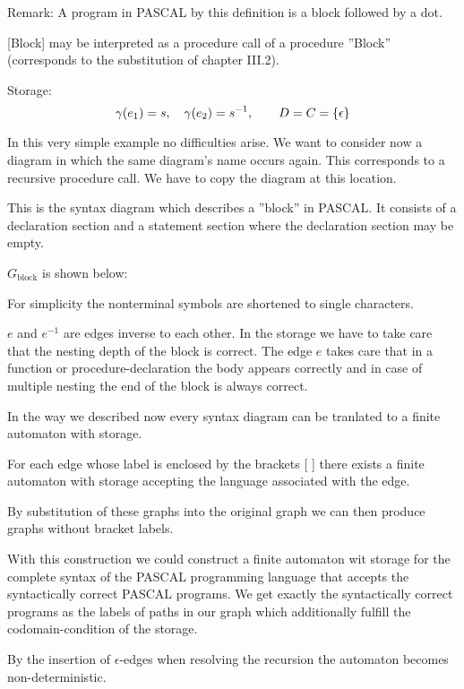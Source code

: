 \missingfigure

Remark: A program in PASCAL by this definition is a block followed by a dot.

\missingfigure

[Block] may be interpreted as a procedure call of a procedure ''Block''
(corresponds to the substitution of chapter III.2).

Storage:
\[ \gamma(e_1) = s,\quad \gamma(e_2) = s^{-1},\qquad D = C = \mbox{$\{\epsilon\}$} \]

In this very simple example no difficulties arise. We want to consider now a
diagram in which the same diagram's name occurs again. This corresponds to a
recursive procedure call. We have to copy the diagram at this location.

\missingfigure

This is the syntax diagram which describes a ''block'' in PASCAL. It consists of
a declaration section and a statement section where the declaration section may
be empty.

$G_{\text{block}}$ is shown below:

\missingfigure

For simplicity the nonterminal symbols are shortened to single characters.

$e$ and $e^{-1}$ are edges inverse to each other. In the storage we have to
take care that the nesting depth of the block is correct. The edge $e$ takes
care that in a function or procedure-declaration the body appears correctly and
in case of multiple nesting the end of the block is always correct.

In the way we described now every syntax diagram can be tranlated to a finite
automaton with storage.

For each edge whose label is enclosed by the brackets [ ] there exists a finite
automaton with storage accepting the language associated with the edge.

By substitution of these graphs into the original graph we can then produce
graphs without bracket labels.

With this construction we could construct a finite automaton wit storage for the
complete syntax of the PASCAL programming language that accepts the
syntactically correct PASCAL programs. We get exactly the syntactically correct
programs as the labels of paths in our graph which additionally fulfill the
codomain-condition of the storage.

By the insertion of $\epsilon$-edges when resolving the recursion the automaton
becomes non-deterministic.

